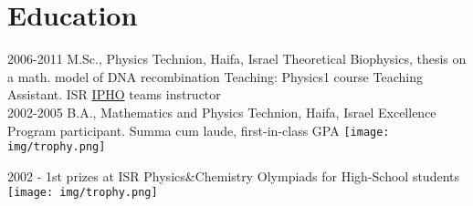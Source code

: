 \documentclass[letterpaper]{twentysecondcv_af} %
\begin{document}
 
\section{Education}
\begin{twenty} %
	\twentyitem
    	{2006-}{2011}       
        {M.Sc., Physics}
        {Technion, Haifa, Israel}
        {Theoretical Biophysics, thesis on a math. model of DNA recombination}
        {Teaching: Physics1 course Teaching Assistant. ISR \href{http://ipho2017.id/aboutIpho}{IPHO} teams instructor}
        \\
	\twentyitem
    	{2002-}{2005}		
        {B.A., Mathematics and Physics}
        {Technion, Haifa, Israel}        
        {Excellence Program participant. Summa cum laude, first-in-class GPA {\texttt{[image: img/trophy.png]}}}       
	\\
\end{twenty}
	2002 - 1st prizes at ISR Physics\&Chemistry Olympiads for High-School students {\texttt{[image: img/trophy.png]}}   

\end{document}
